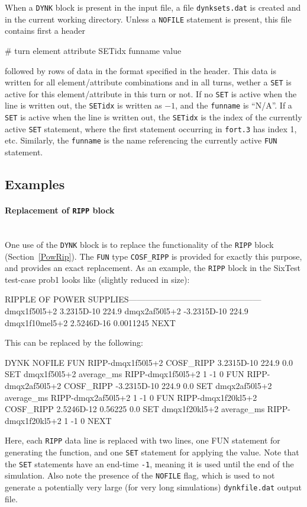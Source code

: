 When a \texttt{DYNK} block is present in the input file, a file \texttt{dynksets.dat} is created and in the current working directory.
Unless a \texttt{NOFILE} statement is present, this file contains first a header
\begin{cverbatim}
# turn element attribute SETidx funname value
\end{cverbatim}
followed by rows of data in the format specified in the header.
This data is written for all element/attribute combinations and in all turns, wether a \texttt{SET} is active for this element/attribute in this turn or not.
If no \texttt{SET} is active when the line is written out, the \texttt{SETidx} is written as $-1$, and the \texttt{funname} is ``N/A''.
If a \texttt{SET} is active when the line is written out, the \texttt{SETidx} is the index of the currently active \texttt{SET} statement, where the first statement occurring in \texttt{fort.3} has index 1, etc.
Similarly, the \texttt{funname} is the name referencing the currently active \texttt{FUN} statement.

\subsection{Examples}

\paragraph{Replacement of \texttt{RIPP} block}~\\
One use of the \texttt{DYNK} block is to replace the functionality of the \texttt{RIPP} block (Section~\ref{PowRip}).
The \texttt{FUN} type \texttt{COSF\_RIPP} is provided for exactly this purpose, and provides an exact replacement.
As an example, the \texttt{RIPP} block in the SixTest test-case prob1 looks like (slightly reduced in size):
\begin{cverbatim}
RIPPLE OF POWER SUPPLIES------------------------------------------------
         dmqx1f50l5+2      3.2315D-10    224.9
         dmqx2af50l5+2    -3.2315D-10    224.9
         dmqx1f10mel5+2    2.5246D-16    0.0011245
NEXT
\end{cverbatim}
This can be replaced by the following:
\begin{cverbatim}
DYNK
NOFILE
FUN RIPP-dmqx1f50l5+2 COSF_RIPP 3.2315D-10 224.9 0.0
SET dmqx1f50l5+2 average_ms RIPP-dmqx1f50l5+2 1 -1 0
FUN RIPP-dmqx2af50l5+2 COSF_RIPP -3.2315D-10 224.9 0.0
SET dmqx2af50l5+2 average_ms RIPP-dmqx2af50l5+2 1 -1 0
FUN RIPP-dmqx1f20kl5+2 COSF_RIPP 2.5246D-12 0.56225 0.0
SET dmqx1f20kl5+2 average_ms RIPP-dmqx1f20kl5+2 1 -1 0
NEXT
\end{cverbatim}
Here, each \texttt{RIPP} data line is replaced with two lines, one FUN statement for generating the function, and one \texttt{SET} statement for applying the value.
Note that the \texttt{SET} statements have an end-time \texttt{-1}, meaning it is used until the end of the simulation.
Also note the presence of the \texttt{NOFILE} flag, which is used to not generate a potentially very large (for very long simulations) \texttt{dynkfile.dat} output file.

